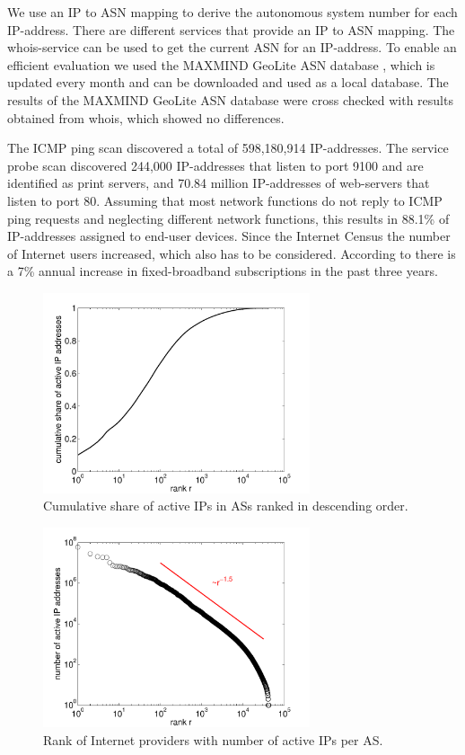 We use an IP to ASN mapping to derive the autonomous system number for each IP-address. There are different services that provide an IP to ASN mapping.
The whois-service can be used to get the current ASN for an IP-address.
To enable an efficient evaluation we used the MAXMIND GeoLite ASN database \cite{geo_ip}, which is updated every month and can be downloaded and used as a local database.
The results of the MAXMIND GeoLite ASN database were cross checked with results obtained from whois, which showed no differences.

The ICMP ping scan discovered a total of 598,180,914 IP-addresses.
The service probe scan discovered 244,000 IP-addresses that listen to port 9100 and are identified as print servers, and 70.84 million IP-addresses of web-servers that listen to port 80.
Assuming that most network functions do not reply to ICMP ping requests and neglecting different network functions, this results in 88.1\% of IP-addresses assigned to end-user devices.
Since the Internet Census the number of Internet users increased, which also has to be considered.
According to \cite{itu2015facts} there is a 7\% annual increase in fixed-broadband subscriptions in the past three years.

\begin{figure}[tb]
\centering
\includegraphics[width=0.7\textwidth]{aslevel/census/figs/shareactiveIPs}
\caption{Cumulative share of active IPs in ASs ranked in descending order.}
\label{fig:shareactiveIPs}
\end{figure}

\begin{figure}[tb]
\centering
\includegraphics[width=0.7\textwidth]{aslevel/census/figs/activeIPs}
\caption{Rank of Internet providers with number of active IPs per AS.}
\label{fig:asrank}
\end{figure}


